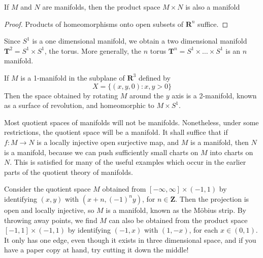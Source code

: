 \begin{theorem}
    If $M$ and $N$ are manifolds, then the product space $M \times N$ is also a manifold
\end{theorem}
\begin{proof}
    Products of homeomorphisms onto open subsets of $\mathbf{R}^n$ suffice.
\end{proof}

\begin{example}
    Since $S^1$ is a one dimensional manifold, we obtain a two dimensional manifold $\mathbf{T}^2 = S^1 \times S^1$, the torus. More generally, the $n$ torus $\mathbf{T}^n = S^1 \times \dots \times S^1$ is an $n$ manifold.
\end{example}

\begin{example}
    If $M$ is a 1-manifold in the subplane of $\mathbf{R}^3$ defined by
    \[ X = \{ (x,y,0): x,y > 0 \} \]
    Then the space obtained by rotating $M$ around the $y$ axis is a 2-manifold, known as a surface of revolution, and homeomorphic to $M \times S^1$.
\end{example}

Most quotient spaces of manifolds will not be manifolds. Nonetheless, under some restrictions, the quotient space will be a manifold. It shall suffice that if $f:M \to N$ is a locally injective open surjective map, and $M$ is a manifold, then $N$ is a manifold, because we can push sufficiently small charts on $M$ into charts on $N$. This is satisfied for many of the useful examples which occur in the earlier parts of the quotient theory of manifolds.

\begin{example}
    Consider the quotient space $M$ obtained from $[-\infty, \infty] \times (-1,1)$ by identifying $(x,y)$ with $(x + n, (-1)^n y)$, for $n \in \mathbf{Z}$. Then the projection is open and locally injective, so $M$ is a manifold, known as the M\"{o}bius strip. By throwing away points, we find $M$ can also be obtained from the product space $[-1,1] \times (-1,1)$ by identifying $(-1,x)$ with $(1,-x)$, for each $x \in (0,1)$. It only has one edge, even though it exists in three dimensional space, and if you have a paper copy at hand, try cutting it down the middle!
\end{example}

